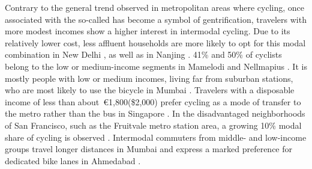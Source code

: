 \begin{refsegment}
Contrary to the general trend observed in metropolitan areas where cycling, once associated with the so-called  has become a symbol of gentrification, travelers with more modest incomes show a higher interest in intermodal cycling. Due to its relatively lower cost, less affluent households are more likely to opt for this modal combination in New Delhi \textcolor{blue}{\autocite[6]{advani_bicycle_2006}}, as well as in Nanjing \textcolor{blue}{\autocite[]{chen_demand_2013, luan_better_2020}}. 41\% and 50\% of cyclists belong to the low or medium-income segments in Mamelodi and Nellmapius \textcolor{blue}{\autocite[35]{bechstein_cycling_2010}}. It is mostly people with low or medium incomes, living far from suburban stations, who are most likely to use the bicycle in Mumbai \textcolor{blue}{\autocite[4]{rastogi_willingness_2010}}. Travelers with a disposable income of less than about~\euro1,800(\$2,000) prefer cycling as a mode of transfer to the metro rather than the bus in Singapore \textcolor{blue}{\autocite[49]{meng_influence_2016}}. In the disadvantaged neighborhoods of San Francisco, such as the Fruitvale metro station area, a growing 10\% modal share of cycling is observed \textcolor{blue}{\autocite[90]{cervero_bike-and-ride_2013}}. Intermodal commuters from middle- and low-income groups travel longer distances in Mumbai \textcolor{blue}{\autocite[686]{rastogi_travel_2003}} and express a marked preference for dedicated bike lanes in Ahmedabad \textcolor{blue}{\autocite[40]{balya_integration_2016}}.%


\end{refsegment}
